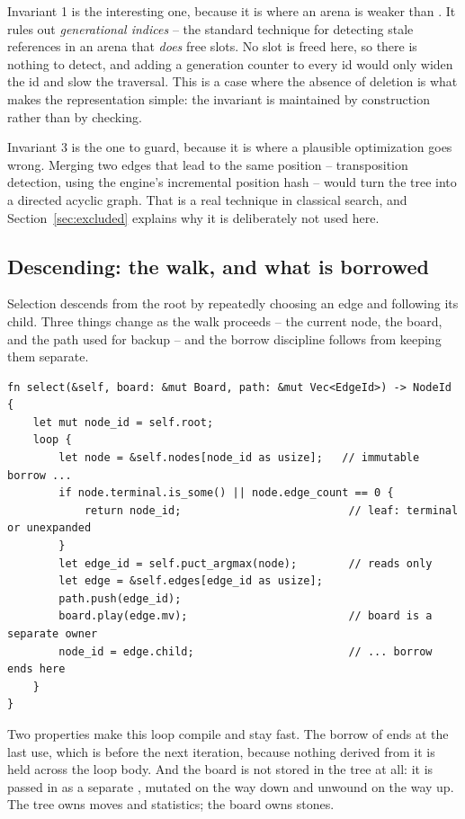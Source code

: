 Invariant 1 is the interesting one, because it is where an arena is weaker than
. It rules out \emph{generational indices} -- the standard technique for
detecting stale references in an arena that \emph{does} free slots. No slot is
freed here, so there is nothing to detect, and adding a generation counter to
every id would only widen the id and slow the traversal. This is a case where the
absence of deletion is what makes the representation simple: the invariant is
maintained by construction rather than by checking.

Invariant 3 is the one to guard, because it is where a plausible optimization
goes wrong. Merging two edges that lead to the same position -- transposition
detection, using the engine's incremental position hash -- would turn the tree
into a directed acyclic graph. That is a real technique in classical search, and
Section~\ref{sec:excluded} explains why it is deliberately not used here.

\subsection{Descending: the walk, and what is borrowed}
\label{sec:walk}

Selection descends from the root by repeatedly choosing an edge and following its
child. Three things change as the walk proceeds -- the current node, the board,
and the path used for backup -- and the borrow discipline follows from keeping
them separate.

\begin{lstlisting}[style=rust,caption={Selection. The borrow of the node ends
before the next iteration, so no conflict is possible.},label={lst:select}]
fn select(&self, board: &mut Board, path: &mut Vec<EdgeId>) -> NodeId {
    let mut node_id = self.root;
    loop {
        let node = &self.nodes[node_id as usize];   // immutable borrow ...
        if node.terminal.is_some() || node.edge_count == 0 {
            return node_id;                          // leaf: terminal or unexpanded
        }
        let edge_id = self.puct_argmax(node);        // reads only
        let edge = &self.edges[edge_id as usize];
        path.push(edge_id);
        board.play(edge.mv);                         // board is a separate owner
        node_id = edge.child;                        // ... borrow ends here
    }
}
\end{lstlisting}

Two properties make this loop compile and stay fast. The borrow of
 ends at the last use, which is before the next
iteration, because nothing derived from it is held across the loop body. And the
board is not stored in the tree at all: it is passed in as a separate
, mutated on the way down and unwound on the way up. The tree
owns moves and statistics; the board owns stones.

